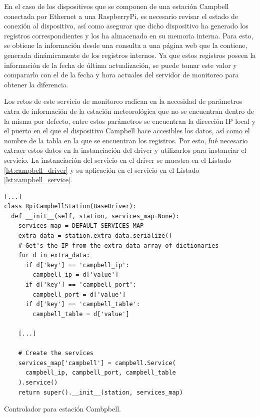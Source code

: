 En el caso de los dispositivos que se componen de una estación Campbell conectada por Ethernet a una RaspberryPi, es necesario revisar el estado de conexión al dispositivo, así como asegurar que dicho dispositivo ha generado los registros correspondientes y los ha almacenado en su memoria interna. Para esto, se obtiene la información desde una consulta a una página web que la contiene, generada dinámicamente de los registros internos. Ya que estos registros poseen la información de la fecha de última actualización, se puede tomar este valor y compararlo con el de la fecha y hora actuales del servidor de monitoreo para obtener la diferencia.

Los retos de este servicio de monitoreo radican en la necesidad de parámetros extra de información de la estación meteorológica que no se encuentran dentro de la misma por defecto, entre estos parámetros se encuentran la dirección IP local y el puerto en el que el dispositivo Campbell hace accesibles los datos, así como el nombre de la tabla en la que se encuentran los registros. Por esto, fué necesario extraer estos datos en la instanciación del driver y utilizarlos para instanciar el servicio. La instanciación del servicio en el driver se muestra en el Listado \ref{lst:campbell_driver} y su aplicación en el servicio en el Listado \ref{lst:campbell_service}.

\begin{listing}
\begin{verbatim}
[...]
class RpiCampbellStation(BaseDriver):
  def __init__(self, station, services_map=None):
    services_map = DEFAULT_SERVICES_MAP
    extra_data = station.extra_data.serialize()
    # Get's the IP from the extra_data array of dictionaries
    for d in extra_data:
      if d['key'] == 'campbell_ip':
        campbell_ip = d['value']
      if d['key'] == 'campbell_port':
        campbell_port = d['value']
      if d['key'] == 'campbell_table':
        campbell_table = d['value']

    [...]

    # Create the services
    services_map['campbell'] = campbell.Service(
      campbell_ip, campbell_port, campbell_table
    ).service()
    return super().__init__(station, services_map)
\end{verbatim}
\caption{Controlador para estación Cambpbell.}
\label{lst:campbell_driver}
\end{listing}


